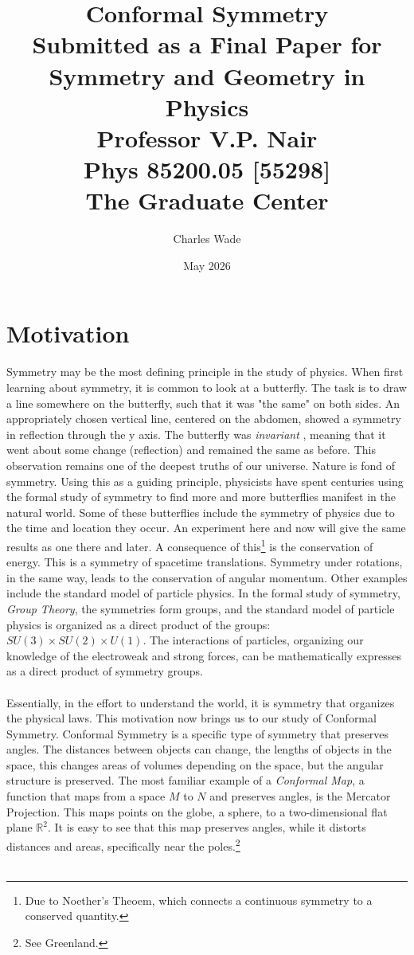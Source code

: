 \documentclass{article}
\title{
    \Huge \textbf{Conformal Symmetry} \\[1.2em]

    \Large Submitted as a Final Paper for \\[0.3em]
    \large Symmetry and Geometry in Physics \\[1em]

    \normalsize
    Professor V.P. Nair \\
    Phys 85200.05 [55298] \\[0.5em]

    \large The Graduate Center
}
\author{
    \large Charles Wade
}
\date{
    \large May 2026
}
\begin{document}
\maketitle
\newpage

\section{Motivation}
Symmetry may be the most defining principle in the study of physics. When first learning about symmetry, it is common to look at a butterfly. The task is to draw a line somewhere on the butterfly, such that it was "the same" on both sides. An appropriately chosen vertical line, centered on the abdomen, showed a symmetry in reflection through the y axis. The butterfly was \textit{invariant} , meaning that it went about some change (reflection) and remained the same as before. This observation remains one of the deepest truths of our universe. Nature is fond of symmetry. Using this as a guiding principle, physicists have spent centuries using the formal study of symmetry to find more and more butterflies manifest in the natural world. Some of these butterflies include the symmetry of physics due to the time and location they occur. An experiment here and now will give the same results as one there and later. A consequence of this\footnote{Due to Noether's Theoem, which connects a continuous symmetry to a conserved quantity.} is the conservation of energy. This is a symmetry of spacetime translations. Symmetry under rotations, in the same way, leads to the conservation of angular momentum. Other examples include the standard model of particle physics. In the formal study of symmetry, \textit{Group Theory}, the symmetries form groups, and the standard model of particle physics is organized as a direct product of the groups: $SU(3) \times SU(2)\times U(1)$. The interactions of particles, organizing our knowledge of the electroweak and strong forces, can be mathematically expresses as a direct product of symmetry groups. 
\\\\
Essentially, in the effort to understand the world, it is symmetry that organizes the physical laws. This motivation now brings us to our study of Conformal Symmetry. Conformal Symmetry is a specific type of symmetry that preserves angles. The distances between objects can change, the lengths of objects in the space, this changes areas of volumes depending on the space, but the angular structure is preserved. The most familiar example of a \textit{Conformal Map}, a function that maps from a space $M$ to $N$ and preserves angles, is the Mercator Projection. This maps points on the globe, a sphere, to a two-dimensional flat plane $\mathds{R}^2$. It is easy to see that this map preserves angles, while it distorts distances and areas, specifically near the poles.\footnote{See Greenland.} \\\\
\end{document}
